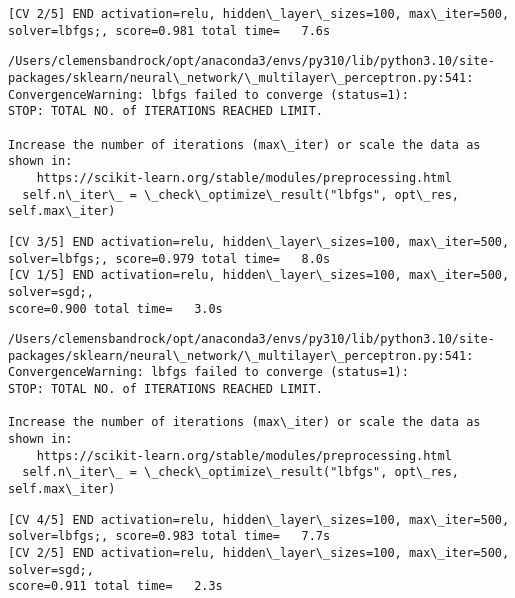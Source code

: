 \documentclass[11pt]{article}
\begin{document}
    \begin{Verbatim}[commandchars=\\\{\}]
[CV 2/5] END activation=relu, hidden\_layer\_sizes=100, max\_iter=500,
solver=lbfgs;, score=0.981 total time=   7.6s
    \end{Verbatim}

    \begin{Verbatim}[commandchars=\\\{\}]
/Users/clemensbandrock/opt/anaconda3/envs/py310/lib/python3.10/site-
packages/sklearn/neural\_network/\_multilayer\_perceptron.py:541:
ConvergenceWarning: lbfgs failed to converge (status=1):
STOP: TOTAL NO. of ITERATIONS REACHED LIMIT.

Increase the number of iterations (max\_iter) or scale the data as shown in:
    https://scikit-learn.org/stable/modules/preprocessing.html
  self.n\_iter\_ = \_check\_optimize\_result("lbfgs", opt\_res, self.max\_iter)
    \end{Verbatim}

    \begin{Verbatim}[commandchars=\\\{\}]
[CV 3/5] END activation=relu, hidden\_layer\_sizes=100, max\_iter=500,
solver=lbfgs;, score=0.979 total time=   8.0s
[CV 1/5] END activation=relu, hidden\_layer\_sizes=100, max\_iter=500, solver=sgd;,
score=0.900 total time=   3.0s
    \end{Verbatim}

    \begin{Verbatim}[commandchars=\\\{\}]
/Users/clemensbandrock/opt/anaconda3/envs/py310/lib/python3.10/site-
packages/sklearn/neural\_network/\_multilayer\_perceptron.py:541:
ConvergenceWarning: lbfgs failed to converge (status=1):
STOP: TOTAL NO. of ITERATIONS REACHED LIMIT.

Increase the number of iterations (max\_iter) or scale the data as shown in:
    https://scikit-learn.org/stable/modules/preprocessing.html
  self.n\_iter\_ = \_check\_optimize\_result("lbfgs", opt\_res, self.max\_iter)
    \end{Verbatim}

    \begin{Verbatim}[commandchars=\\\{\}]
[CV 4/5] END activation=relu, hidden\_layer\_sizes=100, max\_iter=500,
solver=lbfgs;, score=0.983 total time=   7.7s
[CV 2/5] END activation=relu, hidden\_layer\_sizes=100, max\_iter=500, solver=sgd;,
score=0.911 total time=   2.3s
    \end{Verbatim}
\end{document}
